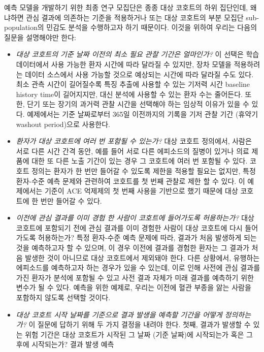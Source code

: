 \documentclass[10.5pt]{book}
\theoremstyle{definition}
\theoremstyle{definition}
\theoremstyle{definition}
\theoremstyle{remark}
\begin{document}
예측 모델을 개발하기 위한 최종 연구 모집단은 종종 대상 코호트의 하위
집단인데, 왜냐하면 관심 결과에 의존하는 기준을 적용하거나 또는 대상
코호트의 부분 모집단 sub-population의 민감도 분석을 수행하고자 하기
때문이다. 이것을 위하여 우리는 다음의 질문을 설명해야만 한다:

\begin{itemize}
\item
  \emph{대상 코호트의 기준 날짜 이전의 최소 필요 관찰 기간은 얼마인가?}
  이 선택은 학습 데이터에서 사용 가능한 환자 시간에 따라 달라질 수
  있지만, 장차 모델을 적용하려는 데이터 소스에서 사용 가능할 것으로
  예상되는 시간에 따라 달라질 수도 있다. 최소 관측 시간이 길어질수록
  특징 추출에 사용할 수 있는 기저력 시간 baseline history time이
  길어지지만, 대신 분석에 사용할 수 있는 환자 수는 줄어든다. 또한, 단기
  또는 장기의 과거력 관찰 시간을 선택해야 하는 임상적 이유가 있을 수
  있다. 예제에서는 기준 날짜로부터 365일 이전까지의 기록을 기저 관찰
  기간 (휴약기 washout period)으로 사용한다.
\item
  \emph{환자가 대상 코호트에 여러 번 포함될 수 있는가?} 대상 코호트
  정의에서, 사람은 서로 다른 시간 간격 동안, 예를 들어 서로 다른
  에피소드의 질병이 있거나 의료 제품에 대한 또 다른 노출 기간이 있는
  경우 그 코호트에 여러 번 포함될 수 있다. 코호트 정의는 환자가 한 번만
  들어갈 수 있도록 제한을 적용할 필요는 없지만, 특정 환자-수준 예측
  문제와 관련하여 코호트를 첫 번째 관찰로 제한 할 수 있다. 이 예제에서는
  기준이 ACE 억제제의 첫 번째 사용을 기반으로 했기 때문에 대상 코호트에
  한 번만 들어갈 수 있다.
\item
  \emph{이전에 관심 결과를 이미 경험 한 사람이 코호트에 들어가도록
  허용하는가?} 대상 코호트에 포함되기 전에 관심 결과를 이미 경험한
  사람이 대상 코호트에 다시 들어가도록 허용하는가? 특정 환자-수준 예측
  문제에 따라, 결과가 처음 발생하게 되는 것을 예측하고자 할 수 있으며,
  이 경우 이전에 결과를 경험한 환자는 그 결과가 처음 발생한 것이
  아니므로 대상 코호트에서 제외돼야 한다. 다른 상황에서, 유행하는
  에피소드를 예측하고자 하는 경우가 있을 수 있는데, 이로 인해 사전에
  관심 결과를 가진 환자가 분석에 포함될 수 있고 사전 결과 자체가 미래
  결과를 예측하기 위한 변수가 될 수 있다. 예측을 위한 예제로, 우리는
  이전에 혈관 부종을 앓는 사람을 포함하지 않도록 선택할 것이다.
\item
  \emph{대상 코호트 시작 날짜를 기준으로 결과 발생을 예측할 기간을
  어떻게 정의하는가?} 이 질문에 답하기 위해 두 가지 결정을 내려야 한다.
  첫째, 결과가 발생할 수 있는 위험 기간은 대상 코호트가 시작된 그 날짜
  (기준 날짜)에 시작되는가 혹은 그 후에 시작되는가? 결과 발생 예측

\end{itemize}
\end{document}
